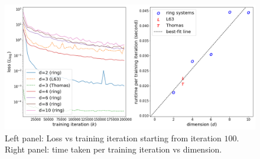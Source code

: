 \begin{figure}[!ht]
    \centering\includegraphics[scale=0.4]{steady-fp/plots/loss-time.png}
    \caption{Left panel: Loss vs training iteration starting from iteration $100$. Right panel: time taken per training iteration vs dimension.}
    \label{fig:time-loss--steady-fp}
\end{figure}
